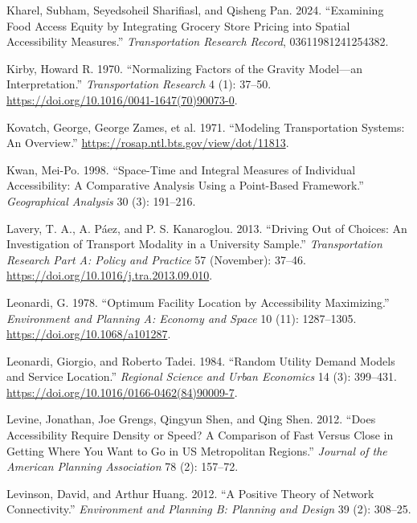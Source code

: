 \documentclass[
]{article}
\newlength{\cslhangindent}
\newenvironment{CSLReferences}[2] %
 {\begin{list}{}{%
  \setlength{\itemindent}{0pt}
  \setlength{\leftmargin}{0pt}
  \setlength{\parsep}{0pt}
  \ifodd #1
   \setlength{\leftmargin}{\cslhangindent}
   \setlength{\itemindent}{-1\cslhangindent}
  \fi
  \setlength{\itemsep}{#2\baselineskip}}}
 {\end{list}}
\begin{document}
\begin{CSLReferences}{1}{0}
Kharel, Subham, Seyedsoheil Sharifiasl, and Qisheng Pan. 2024.
{``Examining Food Access Equity by Integrating Grocery Store Pricing
into Spatial Accessibility Measures.''} \emph{Transportation Research
Record}, 03611981241254382.

Kirby, Howard R. 1970. {``Normalizing Factors of the Gravity Model---an
Interpretation.''} \emph{Transportation Research} 4 (1): 37--50.
\url{https://doi.org/10.1016/0041-1647(70)90073-0}.

Kovatch, George, George Zames, et al. 1971. {``Modeling Transportation
Systems: An Overview.''} \url{https://rosap.ntl.bts.gov/view/dot/11813}.

Kwan, Mei-Po. 1998. {``Space-Time and Integral Measures of Individual
Accessibility: A Comparative Analysis Using a Point-Based Framework.''}
\emph{Geographical Analysis} 30 (3): 191--216.

Lavery, T. A., A. Páez, and P. S. Kanaroglou. 2013. {``Driving Out of
Choices: {An} Investigation of Transport Modality in a University
Sample.''} \emph{Transportation Research Part A: Policy and Practice} 57
(November): 37--46. \url{https://doi.org/10.1016/j.tra.2013.09.010}.

Leonardi, G. 1978. {``Optimum Facility Location by Accessibility
Maximizing.''} \emph{Environment and Planning A: Economy and Space} 10
(11): 1287--1305. \url{https://doi.org/10.1068/a101287}.

Leonardi, Giorgio, and Roberto Tadei. 1984. {``Random Utility Demand
Models and Service Location.''} \emph{Regional Science and Urban
Economics} 14 (3): 399--431.
\url{https://doi.org/10.1016/0166-0462(84)90009-7}.

Levine, Jonathan, Joe Grengs, Qingyun Shen, and Qing Shen. 2012. {``Does
Accessibility Require Density or Speed? A Comparison of Fast Versus
Close in Getting Where You Want to Go in US Metropolitan Regions.''}
\emph{Journal of the American Planning Association} 78 (2): 157--72.

Levinson, David, and Arthur Huang. 2012. {``A Positive Theory of Network
Connectivity.''} \emph{Environment and Planning B: Planning and Design}
39 (2): 308--25.


\end{CSLReferences}
\end{document}
